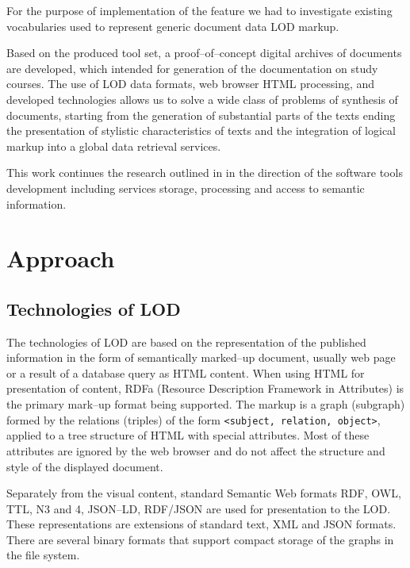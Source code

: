 \documentclass[12pt]{llncs}
\begin{document}
For the purpose of implementation of the feature we had to investigate existing
vocabularies used to represent generic document data LOD markup.


Based on the produced tool set, a proof--of--concept digital archives of
documents are
developed, which intended for generation of the documentation on study
courses. The use of LOD data formats, web browser HTML processing, and
developed technologies allows us to solve a wide class of problems of
synthesis of documents, starting from the generation of substantial
parts of the texts ending the presentation of stylistic characteristics
of texts and the integration of logical markup into a global data
retrieval services.

This work continues the research outlined in \cite{b2} in the direction of
the software tools development including services storage, processing
and access to semantic information.

\section{Approach}
\subsection{Technologies of LOD}

The technologies of LOD are based on the representation of the published
information in the form of semantically marked--up document, usually web
page or a result of a database query as HTML content. When using HTML
for presentation of content, RDFa (Resource Description Framework in
Attributes) is the primary mark--up format being supported. The markup is
a graph (subgraph) formed by the relations (triples) of the form
\texttt{<subject, relation, object>}, applied to a tree
structure of HTML with special attributes. Most of these attributes are
ignored by the web browser and do not affect the structure and style of
the displayed document.

Separately from the visual content, standard Semantic Web formats RDF,
OWL, TTL, N3 and 4, JSON--LD, RDF/JSON are used for presentation to the
LOD. These representations are extensions of standard text, XML and JSON
formats. There are several binary formats that support compact storage
of the graphs in the file system.
\end{document}
